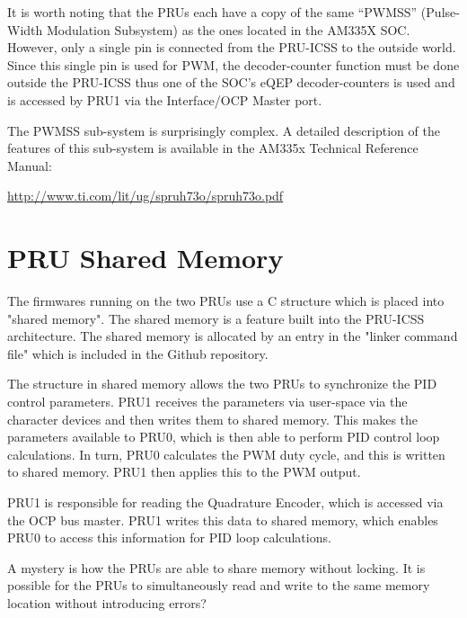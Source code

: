 It is worth noting that the PRUs each have a copy of the same ``PWMSS'' (Pulse-Width Modulation Subsystem) as the ones located in the AM335X SOC.  However, only a single pin is connected from the PRU-ICSS to the outside world.  Since this single pin is used for PWM, the decoder-counter function must be done outside the PRU-ICSS thus one of the SOC's eQEP decoder-counters is used and is accessed by PRU1 via the Interface/OCP Master port.

The PWMSS sub-system is surprisingly complex.  A detailed description of the features of this sub-system is available in the AM335x Technical Reference Manual:

\url{http://www.ti.com/lit/ug/spruh73o/spruh73o.pdf}

\section{PRU Shared Memory}

The firmwares running on the two PRUs use a C structure which is placed into "shared memory".  The shared memory is a feature built into the PRU-ICSS architecture.  The shared memory is allocated by an entry in the "linker command file" which is included in the Github repository.

The structure in shared memory allows the two PRUs to synchronize the PID control parameters.  PRU1 receives the parameters via user-space via the character devices and then writes them to shared memory.  This makes the parameters available to PRU0, which is then able to perform PID control loop calculations.  In turn, PRU0 calculates the PWM duty cycle, and this is written to shared memory.  PRU1 then applies this to the PWM output.

PRU1 is responsible for reading the Quadrature Encoder, which is accessed via the OCP bus master.  PRU1 writes this data to shared memory, which enables PRU0 to access this information for PID loop calculations.

A mystery is how the PRUs are able to share memory without locking.  It is possible for the PRUs to simultaneously read and write to the same memory location without introducing errors?

